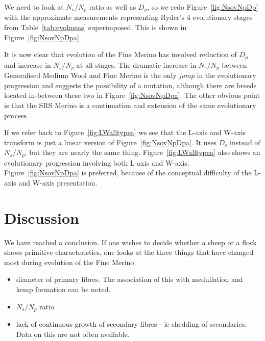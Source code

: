 \documentclass[titlepage]{article}  %
\begin{document}
We need to look at $N_{s}/N_{p}$ ratio as well as $D_{p}$, so we redo Figure~\ref{fig:NsovNpDp} with the approximate measurements representing Ryder's 4 evolutionary stages from Table~\ref{tab:evolmeas} superimposed. This is shown in Figure~\ref{fig:NsovNpDpa}

It is now clear that evolution of the Fine Merino has involved reduction of $D_{p}$ and increase in $N_{s}/N_{p}$ at all stages. The dramatic increase in $N_{s}/N_{p}$ between Generalised Medium Wool and Fine Merino is the only {\em jump} in the evolutionary progression and suggests the possibility of a mutation, although there are breeds located in-between these two in Figure~\ref{fig:NsovNpDpa}. The other obvious point is that the SRS Merino is a continuation and extension of the same evolutionary process. 

If we refer back to Figure~\ref{fig:LWalltypea} we see that the L-axis and W-axis transform is just a linear version of Figure~\ref{fig:NsovNpDpa}. It uses $D_{s}$ instead of $N_{s}/N_{p}$, but they are nearly the same thing. Figure~\ref{fig:LWalltypea} also shows an evolutionary progression involving both L-axis and W-axis. Figure~\ref{fig:NsovNpDpa} is preferred, because of the conceptual difficulty of the L-axis and W-axis presentation.


\clearpage
\section{Discussion}
 We have reached a conclusion. If one wishes to decide whether a sheep or a flock shows primitive characteristics, one looks at the three things that have changed most during evolution of the Fine Merino
\begin{itemize}
\item diameter of primary fibres. The association of this with medullation and kemp formation can be noted.
\item $N_{s}/N_{p}$ ratio
\item lack of continuous growth of secondary fibres - ie shedding of secondaries.  Data on this are not often available.
\end{itemize}
\end{document}

